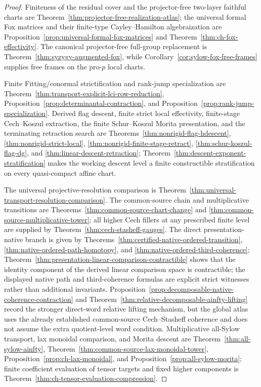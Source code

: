\documentclass[11pt]{article}
\theoremstyle{definition}
\begin{document}
\begin{proof}
Finiteness of the residual cover and the projector-free two-layer faithful charts are Theorem~\ref{thm:projector-free-realization-atlas}; the universal formal Fox matrices and their finite-type Cayley--Hamilton algebraization are Proposition~\ref{prop:universal-formal-fox-matrices} and Theorem~\ref{thm:ch-fox-effectivity}.  The canonical projector-free full-group replacement is Theorem~\ref{thm:syzygy-augmented-fox}, while Corollary~\ref{cor:sylow-fox-free-frames} supplies free frames on the pro-$p$ local charts.

Finite Fitting/conormal strictification and rank-jump specialization are Theorem~\ref{thm:transport-explicit-lci-row-reduction}, Proposition~\ref{prop:determinantal-contraction}, and Proposition~\ref{prop:rank-jump-specialization}.  Derived flag descent, finite strict local effectivity, finite-stage Cech--Koszul extraction, the finite Schur--Koszul Morita presentation, and the terminating retraction search are Theorems~\ref{thm:nonrigid-flag-hdescent}, \ref{thm:nonrigid-strict-local}, \ref{thm:nonrigid-finite-stage-retract}, \ref{thm:schur-koszul-flag-dg}, and \ref{thm:linear-descent-retraction}; Theorem~\ref{thm:descent-exponent-stratification} makes the working descent level a finite constructible stratification on every quasi-compact affine chart.

The universal projective-resolution comparison is Theorem~\ref{thm:universal-transport-resolution-comparison}.  The common-source chain and multiplicative transitions are Theorems~\ref{thm:common-source-chart-change} and \ref{thm:common-source-multiplicative-tower}; all higher Cech fillers at any prescribed finite level are supplied by Theorem~\ref{thm:cech-stasheff-gauges}.  The direct presentation-native branch is given by Theorems~\ref{thm:certified-native-ordered-transition}, \ref{thm:native-ordered-path-homotopy}, and \ref{thm:native-ordered-third-coherence}; Theorem~\ref{thm:presentation-linear-comparison-contractible} shows that the identity component of the derived linear comparison space is contractible; the displayed native path and third-coherence formulas are explicit strict witnesses rather than additional invariants.  Proposition~\ref{prop:decomposable-native-coherence-contraction} and Theorem~\ref{thm:relative-decomposable-ainfty-lifting} record the stronger direct-word relative lifting mechanism, but the global atlas uses the already established common-source Cech--Stasheff coherence and does not assume the extra quotient-level word condition.  Multiplicative all-Sylow transport, lax monoidal comparison, and Morita descent are Theorem~\ref{thm:all-sylow-ainfty}, Theorem~\ref{thm:common-source-lax-monoidal-tower}, Proposition~\ref{prop:ch-lax-monoidal}, and Proposition~\ref{prop:all-sylow-morita}; finite coefficient evaluation of tensor targets and fixed higher components is Theorem~\ref{thm:ch-tensor-evaluation-compression}.


\end{proof}
\end{document}
